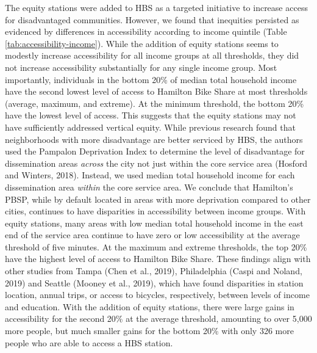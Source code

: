 \documentclass[]{elsarticle} %
\begin{document}
The equity stations were added to HBS as a targeted initiative to
increase access for disadvantaged communities. However, we found that
inequities persisted as evidenced by differences in accessibility
according to income quintile (Table \ref{tab:accessibility-income}).
While the addition of equity stations seems to modestly increase
accessibility for all income groups at all thresholds, they did not
increase accessibility substantially for any single income group. Most
importantly, individuals in the bottom 20\% of median total household
income have the second lowest level of access to Hamilton Bike Share at
most thresholds (average, maximum, and extreme). At the minimum
threshold, the bottom 20\% have the lowest level of access. This
suggests that the equity stations may not have sufficiently addressed
vertical equity. While previous research found that neighborhoods with
more disadvantage are better serviced by HBS, the authors used the
Pampalon Deprivation Index to determine the level of disadvantage for
dissemination areas \emph{across} the city not just within the core
service area (Hosford and Winters, 2018). Instead, we used median total
household income for each dissemination area \emph{within} the core
service area. We conclude that Hamilton's PBSP, while by default located
in areas with more deprivation compared to other cities, continues to
have disparities in accessibility between income groups. With equity
stations, many areas with low median total household income in the east
end of the service area continue to have zero or low accessibility at
the average threshold of five minutes. At the maximum and extreme
thresholds, the top 20\% have the highest level of access to Hamilton
Bike Share. These findings align with other studies from Tampa (Chen et
al., 2019), Philadelphia (Caspi and Noland, 2019) and Seattle (Mooney et
al., 2019), which have found disparities in station location, annual
trips, or access to bicycles, respectively, between levels of income and
education. With the addition of equity stations, there were large gains
in accessibility for the second 20\% at the average threshold, amounting
to over 5,000 more people, but much smaller gains for the bottom 20\%
with only 326 more people who are able to access a HBS station.
\end{document}
